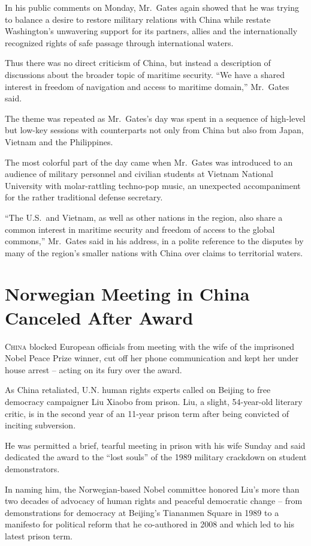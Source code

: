 ﻿\documentclass[12pt]{article}
\begin{document}
In his public comments on Monday, Mr.~Gates again showed that he was trying to balance a desire to
restore military relations with China while restate Washington's unwavering support for its
partners, allies and the internationally recognized rights of safe passage through international
waters.

Thus there was no direct criticism of China, but instead a description of discussions about the
broader topic of maritime security. ``We have a shared interest in freedom of navigation and access
to maritime domain,'' Mr.~Gates said.

The theme was repeated as Mr.~Gates's day was spent in a sequence of high-level but low-key sessions
with counterparts not only from China but also from Japan, Vietnam and the Philippines.

The most colorful part of the day came when Mr.~Gates was introduced to an audience of military
personnel and civilian students at Vietnam National University with molar-rattling techno-pop music,
an unexpected accompaniment for the rather traditional defense secretary.

``The U.S.~and Vietnam, as well as other nations in the region, also share a common interest in
maritime security and freedom of access to the global commons,'' Mr.~Gates said in his address, in a
polite reference to the disputes by many of the region's smaller nations with China over claims to
territorial waters.

\section{Norwegian Meeting in China Canceled After Award}

\lettrine{C}{hina} blocked European officials from meeting with the wife of
the imprisoned Nobel Peace Prize winner, cut off her phone communication and kept her under house
arrest -- acting on its fury over the award.

As China retaliated, U.N. human rights experts called on Beijing to free democracy campaigner Liu
Xiaobo from prison. Liu, a slight, 54-year-old literary critic, is in the second year of an 11-year
prison term after being convicted of inciting subversion.

He was permitted a brief, tearful meeting in prison with his wife Sunday and said dedicated the
award to the ``lost souls'' of the 1989 military crackdown on student demonstrators.

In naming him, the Norwegian-based Nobel committee honored Liu's more than two decades of advocacy
of human rights and peaceful democratic change -- from demonstrations for democracy at Beijing's
Tiananmen Square in 1989 to a manifesto for political reform that he co-authored in 2008 and which
led to his latest prison term.
\end{document}
